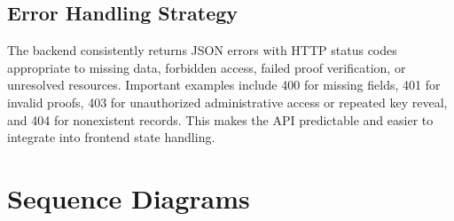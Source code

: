 \documentclass[12pt,a4paper]{report}
\begin{document}
\subsection{Error Handling Strategy}
The backend consistently returns JSON errors with HTTP status codes appropriate to missing data, forbidden access, failed proof verification, or unresolved resources. Important examples include 400 for missing fields, 401 for invalid proofs, 403 for unauthorized administrative access or repeated key reveal, and 404 for nonexistent records. This makes the API predictable and easier to integrate into frontend state handling.

\section{Sequence Diagrams}
\end{document}
